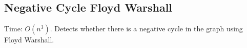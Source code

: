 \subsection{Negative Cycle Floyd Warshall}

Time: $O(n^3)$.
Detects whether there is a negative cycle in the graph using Floyd Warshall.
